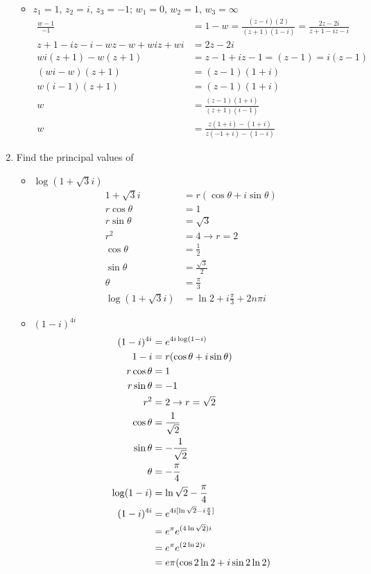 \documentclass[12pt]{article}
\begin{document}
\begin{enumerate}
\begin{itemize}
$$\begin{aligned}
\end{aligned} $$ 
\item $z_1 = 1$, $z_2 = i$, $z_3 = -1$; $w_1 = 0$, $w_2 = 1$, $w_3 = \infty$ 
$$ \begin{aligned} 
\frac{w-1}{-1} &= 1-w = \frac{(z-i)(2)}{(z+1)(1-i)} = \frac{2z - 2i}{z + 1 - iz - i} \\ z + 1 - iz - i - wz - w + wiz + wi &= 2z - 2i \\ wi(z+1) - w(z+1) &= z - 1 + iz - 1 = (z-1) = i(z-1) \\ (wi - w)(z+1) &= (z-1)(1+i) \\ w(i-1)(z+1) &= (z-1)(1+i) \\ w &= \frac{(z-1)(1+i)}{(z+1)(i-1)} \\ w &= \frac{z(1+i) - (1+i)}{z(-1+i) - (1-i)} 
\end{aligned} $$
\end{itemize} 
\item Find the principal values of \begin{itemize} 
\item $\log(1+\sqrt{3}i)$
$$ \begin{aligned} 
1+\sqrt{3}i &= r(\cos \theta + i\sin \theta) \\ r\cos \theta &= 1\\ r\sin \theta &= \sqrt{3} \\ r^2 &= 4 \to r = 2 \\ \cos \theta &= \frac{1}{2} \\ \sin \theta &= \frac{\sqrt{3}}{2} \\ \theta &= \frac{\pi}{3} \\ \log(1 +\sqrt{3}i) &= \ln 2 + i\frac{\pi}{3} + 2n\pi i 
\end{aligned} $$ 
\item $(1-i)^{4i}$
$$ \begin{aligned} 
(1-i)^{4i} &= \e{4i \log(1-i)} \\ 1-i &= r(\cos \theta + i\sin \theta) \\ r\cos \theta &=1 \\ r\sin\theta &= -1 \\ r^2 &=2 \to r = \sqrt{2} \\ \cos \theta &= \frac{1}{\sqrt{2}} \\ \sin \theta &= -\frac{1}{\sqrt{2}} \\ \theta &= -\frac{\pi}{4} \\ \log (1-i) &= \ln \sqrt{2} - \frac{\pi}{4} \\ (1-i)^{4i} &= \e{4i[\ln \sqrt{2} - i\frac{\pi}{4}]} \\ &= \e{\pi} \e{(4\ln\sqrt{2})i} \\ &= \e{\pi} \e{(2\ln 2)i} \\ &= e\pi (\cos 2\ln 2 + i\sin 2\ln 2)

\end{aligned}$$
\end{itemize}
\end{enumerate}
\end{document}
